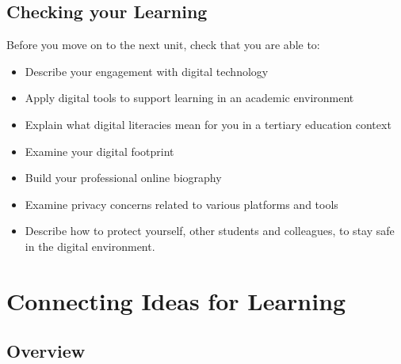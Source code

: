 \documentclass[
]{book}
\providecommand{\tightlist}{%
  \setlength{\itemsep}{0pt}\setlength{\parskip}{0pt}}
\theoremstyle{definition}
\theoremstyle{definition}
\theoremstyle{definition}
\theoremstyle{definition}
\theoremstyle{remark}
\begin{document}
\hypertarget{checking-your-learning-1}{%
\section*{Checking your Learning}\label{checking-your-learning-1}}

\begin{progress}
Before you move on to the next unit, check that you are able to:

\begin{itemize}
\tightlist
\item
  Describe your engagement with digital technology\\
\item
  Apply digital tools to support learning in an academic environment\\
\item
  Explain what digital literacies mean for you in a tertiary education context\\
\item
  Examine your digital footprint\\
\item
  Build your professional online biography\\
\item
  Examine privacy concerns related to various platforms and tools\\
\item
  Describe how to protect yourself, other students and colleagues, to stay safe in the digital environment.
\end{itemize}
\end{progress}

\hypertarget{connecting-ideas-for-learning}{%
\chapter{Connecting Ideas for Learning}\label{connecting-ideas-for-learning}}

\hypertarget{overview-2}{%
\section*{Overview}\label{overview-2}}
\end{document}

